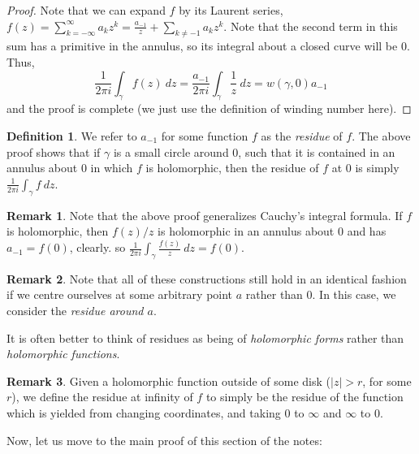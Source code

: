 \documentclass[aps,pra,showpacs,notitlepage,onecolumn,superscriptaddress,nofootinbib]{revtex4-1}
\theoremstyle{definition}
\newtheorem{definition}{Definition}[section]
\newtheorem{remark}{Remark}[section]
\begin{document}
\begin{proof}
  Note that we can expand $f$ by its Laurent series, $f(z) = \sum_{k = -\infty}^{\infty} a_k z^{k} = \frac{a_{-1}}{z} + \sum_{k \neq -1} a_k z^{k}$. Note that
  the second term in this sum has a primitive in the annulus, so its integral about a closed curve will be $0$. Thus,
  \begin{equation}
    \frac{1}{2\pi i} \displaystyle\int_{\gamma} f(z) \ dz = \frac{a_{-1}}{2\pi i} \displaystyle\int_{\gamma} \frac{1}{z} \ dz = w(\gamma, 0) a_{-1}
  \end{equation}
  and the proof is complete (we just use the definition of winding number here).
\end{proof}

\begin{definition}
  We refer to $a_{-1}$ for some function $f$ as the \emph{residue} of $f$. The above proof shows that if $\gamma$ is a small circle
  around $0$, such that it is contained in an annulus about $0$ in which $f$ is holomorphic, then the residue of $f$ at $0$ is simply $\frac{1}{2\pi i} \int_{\gamma} f \ dz$.
\end{definition}

\begin{remark}
  Note that the above proof generalizes Cauchy's integral formula. If $f$ is holomorphic, then $f(z)/z$ is holomorphic in an annulus about $0$ and has $a_{-1} = f(0)$, clearly.
  so $\frac{1}{2 \pi i} \int_{\gamma} \frac{f(z)}{z} \ dz = f(0)$.
\end{remark}

\begin{remark}
  Note that all of these constructions still hold in an identical fashion if we centre ourselves at some arbitrary point $a$ rather than $0$. In this case, we
  consider the \emph{residue around $a$}.
\end{remark}

\noident It is often better to think of residues as being of \emph{holomorphic forms} rather than \emph{holomorphic functions}.

\begin{remark}
  Given a holomorphic function outside of some disk ($|z| > r$, for some $r$), we define the residue at infinity of $f$ to simply be the residue of the function which
  is yielded from changing coordinates, and taking $0$ to $\infty$ and $\infty$ to $0$.
  \end{remark}

\noindent Now, let us move to the main proof of this section of the notes:
\end{document}
